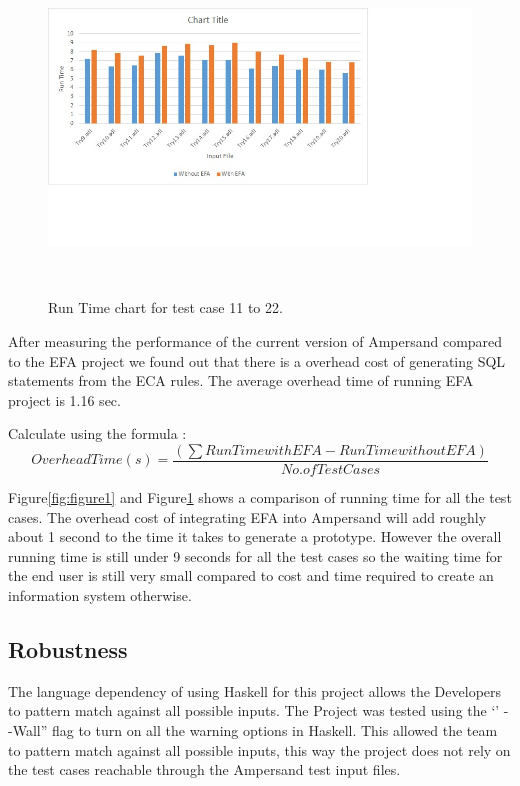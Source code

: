 \documentclass[12pt, svgnames]{article}
\begin{document}
\begin{figure}
  \centering
    \includegraphics[width=1.3\textwidth]{Chart2}
\caption{Run Time chart for test case 11 to 22.}~\label{fig:figure2}
\end{figure}

After measuring the performance of the current version of Ampersand compared to the EFA project we found out that there is a overhead cost of generating SQL statements from the ECA rules. The average overhead time of running EFA project is 1.16 sec. 

Calculate using the formula : 
\begin{equation}
	Overhead Time(s) =\frac{\left ( \sum  Run Time with EFA - Run Time without EFA\right )}{ No. of Test Cases}
\end{equation}

Figure\ref{fig:figure1} and Figure\ref{fig:figure2} shows a comparison of running time for all the test cases. The overhead cost of integrating EFA into Ampersand will add roughly about 1 second to the time it takes to generate a prototype. However the overall running time is still under 9 seconds for all the test cases so the waiting time for the end user is still very small compared to cost and time required to create an information system otherwise.

\subsection{Robustness}
The language dependency of using Haskell for this project allows the Developers to pattern match against all possible inputs. The Project was tested using the `' - -Wall'' flag to turn on all the warning options in Haskell. This allowed the team to pattern match against all possible inputs, this way the project does not rely on the test cases reachable through the Ampersand test input files. 
\end{document}
